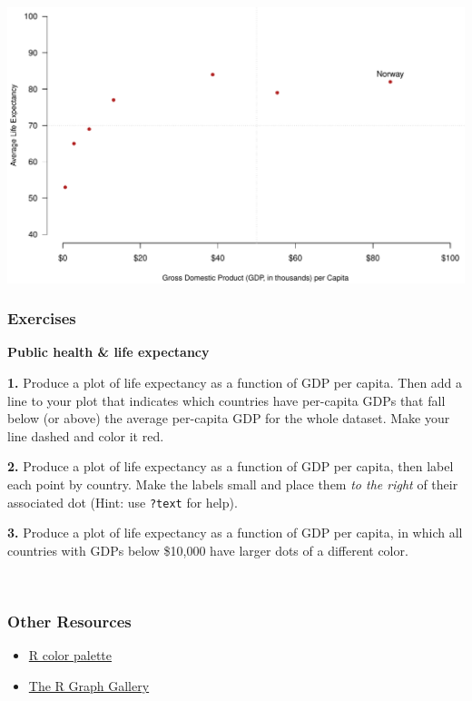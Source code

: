 \documentclass[
]{book}
\providecommand{\tightlist}{%
  \setlength{\itemsep}{0pt}\setlength{\parskip}{0pt}}
\begin{document}
\includegraphics{figures/unnamed-chunk-550-1.pdf}

\hypertarget{exercises-15}{%
\subsubsection*{Exercises}\label{exercises-15}}

\textbf{Public health \& life expectancy}

\textbf{1.} Produce a plot of life expectancy as a function of GDP per capita. Then add a line to your plot that indicates which countries have per-capita GDPs that fall below (or above) the average per-capita GDP for the whole dataset. Make your line dashed and color it red.

\textbf{2.} Produce a plot of life expectancy as a function of GDP per capita, then label each point by country. Make the labels small and place them \emph{to the right} of their associated dot (Hint: use \texttt{?text} for help).

\textbf{3.} Produce a plot of life expectancy as a function of GDP per capita, in which all countries with GDPs below \$10,000 have larger dots of a different color.

~

\hypertarget{other-resources-4}{%
\subsubsection*{Other Resources}\label{other-resources-4}}

\begin{itemize}
\tightlist
\item
  \href{http://www.stat.columbia.edu/~tzheng/files/Rcolor.pdf}{R color palette}\\
\item
  \href{https://www.r-graph-gallery.com/}{The R Graph Gallery}
\end{itemize}
\end{document}
